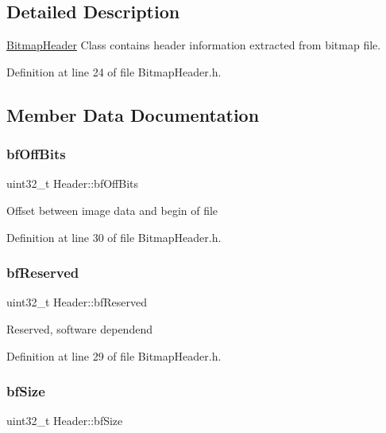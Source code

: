 \subsection{Detailed Description}
\mbox{\hyperlink{classBitmapHeader}{Bitmap\+Header}} Class contains header information extracted from bitmap file. 

Definition at line 24 of file Bitmap\+Header.\+h.



\subsection{Member Data Documentation}
\mbox{\label{structHeader_a14ebd86ca12bd051ade0831f6dade02d}} 
\subsubsection{\texorpdfstring{bfOffBits}{bfOffBits}}
{\footnotesize\ttfamily uint32\+\_\+t Header\+::bf\+Off\+Bits}

Offset between image data and begin of file 

Definition at line 30 of file Bitmap\+Header.\+h.

\mbox{\label{structHeader_a71d1ea38530c52d3bf8b278e673a9541}} 
\subsubsection{\texorpdfstring{bfReserved}{bfReserved}}
{\footnotesize\ttfamily uint32\+\_\+t Header\+::bf\+Reserved}

Reserved, software dependend 

Definition at line 29 of file Bitmap\+Header.\+h.

\mbox{\label{structHeader_a898252c4f5d633e46944b37ba145fca5}} 
\subsubsection{\texorpdfstring{bfSize}{bfSize}}
{\footnotesize\ttfamily uint32\+\_\+t Header\+::bf\+Size}

